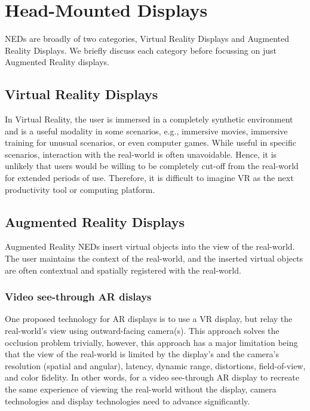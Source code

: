 \section{Head-Mounted Displays}
NEDs are broadly of two categories, Virtual Reality Displays and Augmented Reality Displays. 
We briefly discuss each category before focussing on just Augmented Reality displays.

\subsection{Virtual Reality Displays}
\label{sec:background:vr_displays}
In Virtual Reality, the user is immersed in a completely synthetic environment and is a useful modality in some scenarios, e.g., immersive movies, immersive training for unusual scenarios, or even computer games. 
While useful in specific scenarios, interaction with the real-world is often unavoidable. 
Hence, it is unlikely that users would be willing to be completely cut-off from the real-world for extended periods of use. 
Therefore, it is difficult to imagine VR as the next productivity tool or computing platform.

\subsection{Augmented Reality Displays}
\label{sec:background:ar_displays}
Augmented Reality NEDs insert virtual objects into the view of the real-world. 
The user maintains the context of the real-world, and the inserted virtual objects are often contextual and spatially registered with the real-world.

\subsubsection{Video see-through AR dislays}
\label{sec:background:vst_displays}
One proposed technology for AR displays is to use a VR display, but relay the real-world’s view using outward-facing camera(s). 
This approach solves the occlusion problem trivially, however, this approach has a major limitation being that the view of the real-world is limited by the display’s and the camera’s resolution (spatial and angular), latency, dynamic range, distortions, field-of-view, and color fidelity. 
In other words, for a video see-through AR display to recreate the same experience of viewing the real-world without the display, camera technologies and display technologies need to advance significantly.

